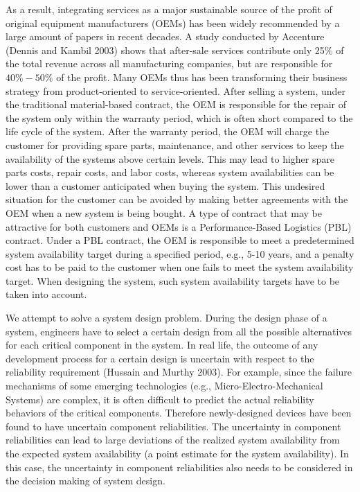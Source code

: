 \documentclass[preprint,12pt]{elsarticle}
\begin{document}
As a result, integrating services as a major sustainable source of the profit of original equipment manufacturers (OEMs) has been widely recommended by a large amount of papers in recent decades. A study conducted by Accenture (Dennis and Kambil 2003) shows that after-sale services contribute only 25\% of the total revenue across all manufacturing companies, but are responsible for $40\%-50\%$ of the profit. Many OEMs thus has been transforming their business strategy from product-oriented to service-oriented. After selling a system, under the traditional material-based contract, the OEM is responsible for the repair of the system only within the warranty period, which is often short compared to the life cycle of the system. After the warranty period, the OEM will charge the customer for providing spare parts, maintenance, and other services to keep the availability of the systems above certain levels. This may lead to higher spare parts costs, repair costs, and labor costs, whereas system availabilities can be lower than a customer anticipated when buying the system. This undesired situation for the customer can be avoided by making better agreements with the OEM when a new system is being bought. A type of contract that may be attractive for both customers and OEMs is a Performance-Based Logistics (PBL) contract. Under a PBL contract, the OEM is responsible to meet a predetermined system availability target during a specified period, e.g., 5-10 years, and a penalty cost has to be paid to the customer when one fails to meet the system availability target. When designing the system, such system availability targets have to be taken into account.



We attempt to solve a system design problem. During the design phase of a system, engineers have to select a certain design from all the possible alternatives for each critical component in the system. In real life, the outcome of any development process for a certain design is uncertain with respect to the reliability requirement (Hussain and Murthy 2003). For example, since the failure mechanisms of some emerging technologies (e.g., Micro-Electro-Mechanical Systems) are complex, it is often difficult to predict the actual reliability behaviors of the critical components. Therefore newly-designed devices have been found to have uncertain component reliabilities. The uncertainty in component reliabilities can lead to large deviations of the realized system availability from the expected system availability (a point estimate for the system availability). In this case, the uncertainty in component reliabilities also needs to be considered in the decision making of system design.
\end{document}
